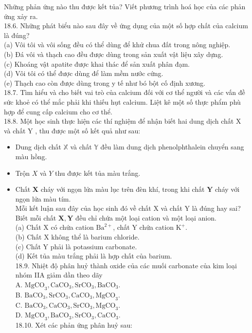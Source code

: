 \documentclass[10pt]{article}
\begin{document}
Những phản ứng nào thu được kết tủa? Viết phương trình hoá học của các phản ứng xảy ra.\\
18.6. Những phát biểu nào sau đây về ứng dụng của một số hợp chất của calcium là đúng?\\
(a) Vôi tôi và vôi sống đều có thể dùng để khử chua đất trong nông nghiệp.\\
(b) Đá vôi và thạch cao đều được dùng trong sản xuất vật liệu xây dựng.\\
(c) Khoáng vật apatite được khai thác để sản xuất phân đạm.\\
(d) Vôi tôi có thể được dùng để làm mềm nước cứng.\\
(e) Thạch cao còn được dùng trong y tế như bó bột cố định xương.\\
18.7. Tìm hiểu và cho biết vai trò của calcium đối với cơ thể người và các vấn đề sức khoẻ có thể mắc phải khi thiếu hụt calcium. Liệt kê một số thực phẩm phù hợp để cung cấp calcium cho cơ thể.\\
18.8. Một học sinh thực hiện các thí nghiệm để nhận biết hai dung dịch chất X và chất Y , thu được một số kết quả như sau:

\begin{itemize}
  \item Dung dịch chất $\mathbb{X}$ và chất $\mathbb{Y}$ đều làm dung dịch phenolphthalein chuyển sang màu hồng.
  \item Trộn $X$ và $Y$ thu được kết tủa màu trắng.
  \item Chất $\mathbf{X}$ cháy với ngọn lửa màu lục trên đèn khí, trong khi chất $\mathbf{Y}$ cháy với ngọn lửa màu tím.\\
Mỗi kết luận sau đây của học sinh đó về chất X và chất Y là đúng hay sai? Biết mỗi chất $\mathbf{X}, \mathbf{Y}$ đều chỉ chứa một loại cation và một loại anion.\\
(a) Chất X có chứa cation $\mathrm{Ba}^{2+}$, chất Y chứa cation $\mathrm{K}^{+}$.\\
(b) Chất X không thể là barium chloride.\\
(c) Chất Y phải là potassium carbonate.\\
(d) Kết tủa màu trắng phải là hợp chất của barium.\\
18.9. Nhiệt độ phân huỷ thành oxide của các muối carbonate của kim loại nhóm IIA giảm dần theo dãy\\
A. $\mathrm{MgCO}_{3}, \mathrm{CaCO}_{3}, \mathrm{SrCO}_{3}, \mathrm{BaCO}_{3}$.\\
B. $\mathrm{BaCO}_{3}, \mathrm{SrCO}_{3}, \mathrm{CaCO}_{3}, \mathrm{MgCO}_{3}$.\\
C. $\mathrm{BaCO}_{3}, \mathrm{CaCO}_{3}, \mathrm{SrCO}_{3}, \mathrm{MgCO}_{3}$.\\
D. $\mathrm{MgCO}_{3}, \mathrm{BaCO}_{3}, \mathrm{SrCO}_{3}, \mathrm{CaCO}_{3}$.\\
18.10. Xét các phản ứng phân huỷ sau:
\end{itemize}
\end{document}
